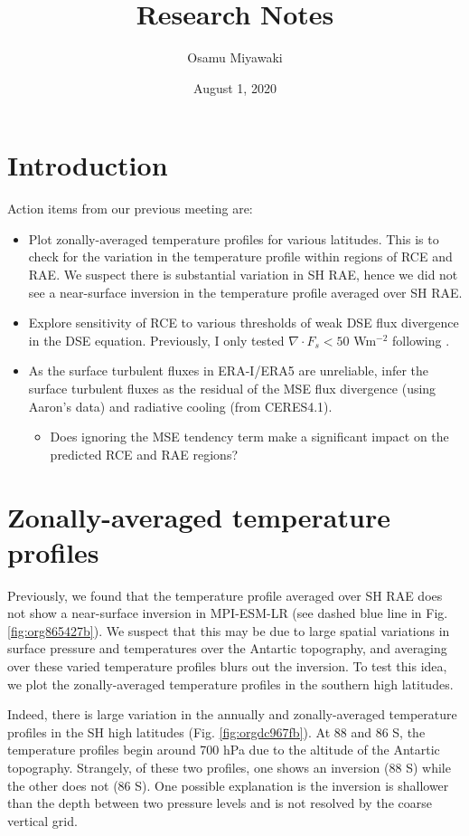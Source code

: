 \documentclass[11pt]{article}
\author{Osamu Miyawaki}
\date{August 1, 2020}
\title{Research Notes}
\begin{document}
\maketitle

\section{Introduction}
\label{sec:org75b15d6}
Action items from our previous meeting are:
\begin{itemize}
\item Plot zonally-averaged temperature profiles for various latitudes. This is to check for the variation in the temperature profile within regions of RCE and RAE. We suspect there is substantial variation in SH RAE, hence we did not see a near-surface inversion in the temperature profile averaged over SH RAE.
\item Explore sensitivity of RCE to various thresholds of weak DSE flux divergence in the DSE equation. Previously, I only tested \(\nabla\cdot F_s<50\) Wm\(^{-2}\) following \cite{jakob2019}.
\item As the surface turbulent fluxes in ERA-I/ERA5 are unreliable, infer the surface turbulent fluxes as the residual of the MSE flux divergence (using Aaron's data) and radiative cooling (from CERES4.1).
\begin{itemize}
\item Does ignoring the MSE tendency term make a significant impact on the predicted RCE and RAE regions?
\end{itemize}
\end{itemize}

\section{Zonally-averaged temperature profiles}
\label{sec:org7fea45e}
Previously, we found that the temperature profile averaged over SH RAE does not show a near-surface inversion in MPI-ESM-LR (see dashed blue line in Fig. \ref{fig:org865427b}). We suspect that this may be due to large spatial variations in surface pressure and temperatures over the Antartic topography, and averaging over these varied temperature profiles blurs out the inversion. To test this idea, we plot the zonally-averaged temperature profiles in the southern high latitudes.

Indeed, there is large variation in the annually and zonally-averaged temperature profiles in the SH high latitudes (Fig. \ref{fig:orgdc967fb}). At 88 and 86 S, the temperature profiles begin around 700 hPa due to the altitude of the Antartic topography. Strangely, of these two profiles, one shows an inversion (88 S) while the other does not (86 S). One possible explanation is the inversion is shallower than the depth between two pressure levels and is not resolved by the coarse vertical grid.
\end{document}

